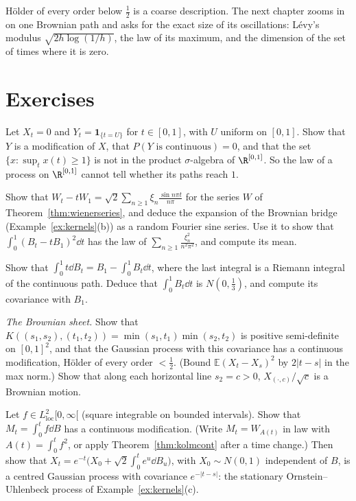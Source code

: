 H\"older of every order below $\frac12$ is a coarse description. The next chapter zooms in on one Brownian path and asks for the exact size of its
oscillations: L\'evy's modulus $\sqrt{2h\log(1/h)}$, the law of its maximum, and the dimension of the set of times where it is zero.

\section{Exercises}

\begin{exercise}[$\star$]\label{ex:notevent}
Let $X_t=0$ and $Y_t=\mathbf 1_{\{t=U\}}$ for $t\in[0,1]$, with $U$ uniform on $[0,1]$. Show that $Y$ is a modification of $X$, that $P(Y\text{ is continuous})=0$, and that the set $\{x:\sup_tx(t)\ge1\}$ is not in the product $\sigma$-algebra of $\R^{[0,1]}$. So the law of a
process on $\R^{[0,1]}$ cannot tell whether its paths reach $1$.
\end{exercise}

\begin{exercise}[$\star$]\label{ex:bridgeseries}
Show that $W_t-tW_1=\sqrt2\sum_{n\ge1}\xi_n\frac{\sin n\pi t}{n\pi}$ for the series $W$ of Theorem~\ref{thm:wienerseries}, and deduce the expansion of the Brownian bridge (Example~\ref{ex:kernels}(b)) as a random
Fourier sine series. Use it to show that $\int_0^1(B_t-tB_1)^2\dd t$ has the law of $\sum_{n\ge1}\frac{\xi_n^2}{n^2\pi^2}$, and compute its mean.
\end{exercise}

\begin{exercise}[$\star$]\label{ex:intbyparts}
Show that $\int_0^1t\dd B_t=B_1-\int_0^1B_t\dd t$, where the last integral is a Riemann integral of the continuous path. Deduce that $\int_0^1B_t\dd t$ is $N(0,\frac13)$, and compute its covariance with $B_1$.
\end{exercise}

\begin{exercise}[$\star\star$]\label{ex:sheet}
\emph{The Brownian sheet.} Show that $K((s_1,s_2),(t_1,t_2))=\min(s_1,t_1)\min(s_2,t_2)$ is positive semi-definite on $[0,1]^2$, and that the Gaussian process with this covariance has a continuous modification,
H\"older of every order $<\frac12$. (Bound $\mathbb E(X_t-X_s)^2$ by $2|t-s|$ in the max norm.) Show that along each horizontal line $s_2=c>0$, $X_{(\cdot,c)}/\sqrt c$ is a Brownian motion.
\end{exercise}

\begin{exercise}[$\star\star$]\label{ex:ou}
Let $f\in L^2_{\mathrm{loc}}[0,\infty[$ (square integrable on bounded intervals). Show that $M_t=\int_0^tf\dd B$ has a continuous modification. (Write $M_t=W_{A(t)}$ in law with $A(t)=\int_0^tf^2$, or apply
Theorem~\ref{thm:kolmcont} after a time change.) Then show that $X_t=e^{-t}\bigl(X_0+\sqrt2\int_0^te^u\dd B_u\bigr)$, with $X_0\sim N(0,1)$ independent of $B$, is a centred Gaussian process with covariance $e^{-|t-s|}$:
the stationary Ornstein--Uhlenbeck process of Example~\ref{ex:kernels}(c).
\end{exercise}

